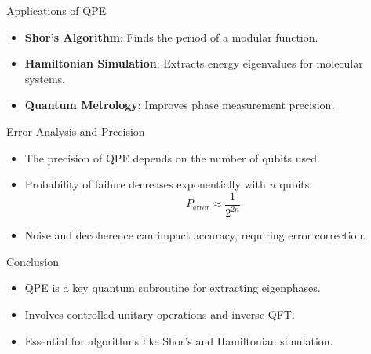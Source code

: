\documentclass{beamer}
\begin{document}
\begin{frame}{Applications of QPE}
    \begin{itemize}
        \item \textbf{Shor's Algorithm}: Finds the period of a modular function.
        \item \textbf{Hamiltonian Simulation}: Extracts energy eigenvalues for molecular systems.
        \item \textbf{Quantum Metrology}: Improves phase measurement precision.
    \end{itemize}
\end{frame}

\begin{frame}{Error Analysis and Precision}
    \begin{itemize}
        \item The precision of QPE depends on the number of qubits used.
        \item Probability of failure decreases exponentially with $n$ qubits.
        \[
        P_{\text{error}} \approx \frac{1}{2^{2n}}
        \]
        \item Noise and decoherence can impact accuracy, requiring error correction.
    \end{itemize}
\end{frame}

\begin{frame}{Conclusion}
    \begin{itemize}
        \item QPE is a key quantum subroutine for extracting eigenphases.
        \item Involves controlled unitary operations and inverse QFT.
        \item Essential for algorithms like Shor's and Hamiltonian simulation.
    \end{itemize}
\end{frame}
\end{document}
